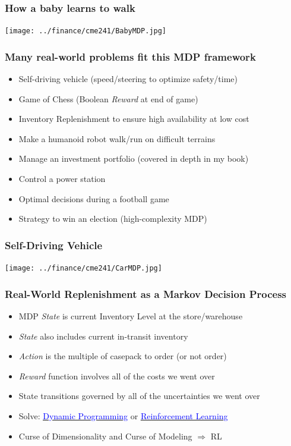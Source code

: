 \documentclass[handout]{beamer}
\begin{document}
\begin{frame}
\frametitle{How a baby learns to walk}
\texttt{[image: ../finance/cme241/BabyMDP.jpg]}
\end{frame}

\begin{frame}
\frametitle{Many real-world problems fit this MDP framework}
\pause
\begin{itemize}[<+->]
\item Self-driving vehicle (speed/steering to optimize safety/time)
\item Game of Chess (Boolean {\em Reward} at end of game)
\item Inventory Replenishment to ensure high availability at low cost
\item Make a humanoid robot walk/run on difficult terrains
\item Manage an investment portfolio (covered in depth in my book)
\item Control a power station
\item Optimal decisions during a football game
\item Strategy to win an election (high-complexity MDP)
\end{itemize}
\end{frame}

\begin{frame}
\frametitle{Self-Driving Vehicle}
\texttt{[image: ../finance/cme241/CarMDP.jpg]}
\end{frame}

\begin{frame}
\frametitle{Real-World Replenishment as a Markov Decision Process}
\pause
\begin{itemize}[<+->]
\item MDP {\em State} is current Inventory Level at the store/warehouse
\item {\em State} also includes current in-transit inventory
\item {\em Action} is the multiple of casepack to order (or not order)
\item {\em Reward} function involves all of the costs we went over
\item State transitions governed by all of the uncertainties we went over
\item Solve: \href{https://en.wikipedia.org/wiki/Dynamic_programming}{\underline{\textcolor{blue}{Dynamic Programming}}} or
 \href{https://en.wikipedia.org/wiki/Reinforcement_learning}{\underline{\textcolor{blue}{Reinforcement Learning}}}
\item Curse of Dimensionality and Curse of Modeling $\Rightarrow$ RL
\end{itemize}
\end{frame}
\end{document}
